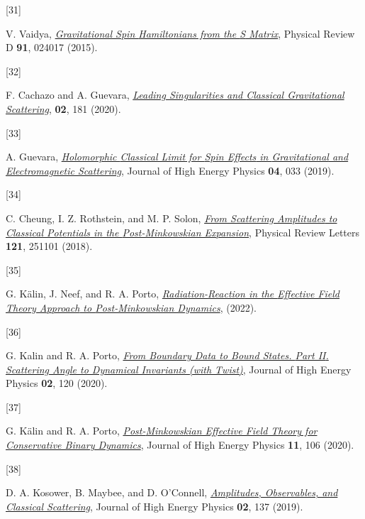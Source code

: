 \documentclass[
  10pt,
  a4paper,
  DIV=11,
  numbers=noendperiod,
  oneside]{scrreprt}
\newlength{\cslhangindent}
\newlength{\csllabelwidth}
\newlength{\cslentryspacingunit} %
\newenvironment{CSLReferences}[2] %
 {%
  \setlength{\parindent}{0pt}
  \ifodd #1
  \let\oldpar\par
  \def\par{\hangindent=\cslhangindent\oldpar}
  \fi
  \setlength{\parskip}{#2\cslentryspacingunit}
 }%
 {}
\newcommand{\CSLLeftMargin}[1]{\parbox[t]{\csllabelwidth}{#1}}
\newcommand{\CSLRightInline}[1]{\parbox[t]{\linewidth - \csllabelwidth}{#1}\break}
\DeclareRobustCommand{\[}{\begin{equation}}
\DeclareRobustCommand{\]}{\end{equation}}
\begin{document}
\begin{CSLReferences}{0}{0}
\leavevmode{}%
\CSLLeftMargin{{[}31{]} }%
\CSLRightInline{V. Vaidya,
\emph{\href{https://doi.org/10.1103/PhysRevD.91.024017}{Gravitational
Spin {Hamiltonians} from the {S} Matrix}}, Physical Review D
\textbf{91}, 024017 (2015).}

\leavevmode{}%
\CSLLeftMargin{{[}32{]} }%
\CSLRightInline{F. Cachazo and A. Guevara,
\emph{\href{https://doi.org/10.1007/JHEP02(2020)181}{Leading
{Singularities} and {Classical Gravitational Scattering}}}, \textbf{02},
181 (2020).}

\leavevmode{}%
\CSLLeftMargin{{[}33{]} }%
\CSLRightInline{A. Guevara,
\emph{\href{https://doi.org/10.1007/JHEP04(2019)033}{Holomorphic
{Classical Limit} for {Spin Effects} in {Gravitational} and
{Electromagnetic Scattering}}}, Journal of High Energy Physics
\textbf{04}, 033 (2019).}

\leavevmode{}%
\CSLLeftMargin{{[}34{]} }%
\CSLRightInline{C. Cheung, I. Z. Rothstein, and M. P. Solon,
\emph{\href{https://doi.org/10.1103/PhysRevLett.121.251101}{From
{Scattering Amplitudes} to {Classical Potentials} in the
{Post-Minkowskian Expansion}}}, Physical Review Letters \textbf{121},
251101 (2018).}

\leavevmode{}%
\CSLLeftMargin{{[}35{]} }%
\CSLRightInline{G. Kälin, J. Neef, and R. A. Porto,
\emph{\href{https://arxiv.org/abs/2207.00580}{Radiation-{Reaction} in
the {Effective Field Theory Approach} to {Post-Minkowskian Dynamics}}},
(2022).}

\leavevmode{}%
\CSLLeftMargin{{[}36{]} }%
\CSLRightInline{G. Kalin and R. A. Porto,
\emph{\href{https://doi.org/10.1007/JHEP02(2020)120}{From Boundary Data
to Bound States. {Part II}. {Scattering} Angle to Dynamical Invariants
(with Twist)}}, Journal of High Energy Physics \textbf{02}, 120 (2020).}

\leavevmode{}%
\CSLLeftMargin{{[}37{]} }%
\CSLRightInline{G. Kälin and R. A. Porto,
\emph{\href{https://doi.org/10.1007/JHEP11(2020)106}{Post-{Minkowskian
Effective Field Theory} for {Conservative Binary Dynamics}}}, Journal of
High Energy Physics \textbf{11}, 106 (2020).}

\leavevmode{}%
\CSLLeftMargin{{[}38{]} }%
\CSLRightInline{D. A. Kosower, B. Maybee, and D. O'Connell,
\emph{\href{https://doi.org/10.1007/JHEP02(2019)137}{Amplitudes,
Observables, and Classical Scattering}}, Journal of High Energy Physics
\textbf{02}, 137 (2019).}


\end{CSLReferences}
\end{document}
